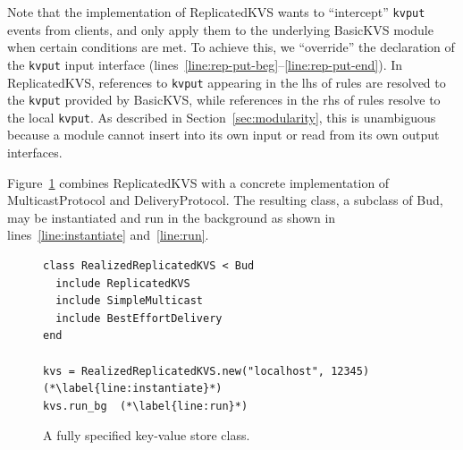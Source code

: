 Note that the implementation of ReplicatedKVS wants to ``intercept''
\texttt{kvput} events from clients, and only apply them to the underlying
BasicKVS module when certain conditions are met. To achieve this, we
``override'' the declaration of the \texttt{kvput} input interface
(lines~\ref{line:rep-put-beg}--\ref{line:rep-put-end}). In ReplicatedKVS,
references to \texttt{kvput} appearing in the lhs of rules are resolved to the
\texttt{kvput} provided by BasicKVS, while references in the rhs of rules
resolve to the local \texttt{kvput}. As described in
Section~\ref{sec:modularity}, this is unambiguous because a module cannot insert
into its own input or read from its own output interfaces.

Figure~\ref{fig:kvs-budclass} combines ReplicatedKVS with a concrete
implementation of MulticastProtocol and DeliveryProtocol.  The resulting class,
a subclass of Bud, may be instantiated and run in the background as shown in
lines~\ref{line:instantiate} and~\ref{line:run}.

\begin{figure}[t]
\begin{scriptsize}
\begin{lstlisting}
class RealizedReplicatedKVS < Bud
  include ReplicatedKVS
  include SimpleMulticast
  include BestEffortDelivery
end

kvs = RealizedReplicatedKVS.new("localhost", 12345)  (*\label{line:instantiate}*)
kvs.run_bg  (*\label{line:run}*)
\end{lstlisting}
\centering
\vspace{-10pt}
\caption{A fully specified key-value store class.}
\label{fig:kvs-budclass}
\end{scriptsize}
\vspace{-2pt}
\end{figure}

